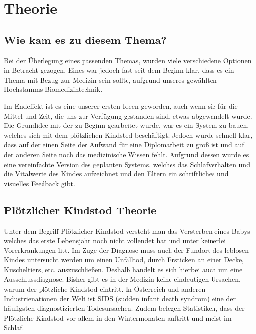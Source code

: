 \chapter{Theorie}
\section[Wie kam es zu diesem Thema?]{Wie kam es zu diesem Thema?\authorlinda} %
Bei der Überlegung eines passenden Themas, wurden viele verschiedene Optionen in Betracht gezogen. 
Eines war jedoch fast seit dem Beginn klar, dass es ein Thema mit Bezug zur Medizin sein sollte, aufgrund unseres gewählten 
Hochstamms Biomedizintechnik. 

\noindent
Im Endeffekt ist es eine unserer ersten Ideen geworden, auch wenn sie für die Mittel und Zeit,
die uns zur Verfügung gestanden sind, etwas abgewandelt wurde. Die Grundidee mit der zu Beginn gearbeitet wurde, 
war es ein System zu bauen, welches sich mit dem plötzlichen Kindstod beschäftigt. 
Jedoch wurde schnell klar, dass auf der einen Seite der Aufwand für eine Diplomarbeit zu groß ist und auf der anderen Seite 
noch das medizinische Wissen fehlt. Aufgrund dessen wurde es eine vereinfachte Version des geplanten Systems, 
welches das Schlafverhalten und die Vitalwerte des Kindes aufzeichnet und den Eltern ein schriftliches und visuelles Feedback gibt.

\section[Plötzlicher Kindstod Theorie]{Plötzlicher Kindstod Theorie\authorkatrin} %
Unter dem Begriff Plötzlicher Kindstod versteht man das Versterben eines Babys welches
das erste Lebensjahr noch nicht vollendet hat und unter keinerlei Vorerkrankungen litt.
Im Zuge der Diagnose muss auch der Fundort des leblosen Kindes untersucht werden um einen Unfalltod, 
durch Ersticken an einer Decke, Kuscheltiers, etc. auszuschließen. 
Deshalb handelt es sich hierbei auch um eine Ausschlussdiagnose. Bisher gibt es in der Medizin keine eindeutigen Ursachen, warum der plötzliche Kindstod eintritt. 
In Österreich und anderen Industrienationen der Welt ist SIDS (sudden infant death syndrom) eine der häufigsten diagnostizierten Todesursachen.\cite{meinmed_sids}
Zudem belegen Statistiken, dass der Plötzliche Kindstod vor allem in den Wintermonaten auftritt und meist im Schlaf. \cite{der-ploetzliche-saeuglingstod-epidemiologie-aetiologie-pathophysiologie-und-differenzialdiagnostik} \cite{Poets2020}

